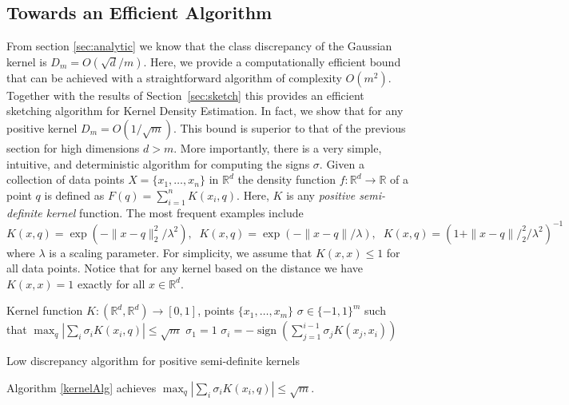 \documentclass[12pt]{colt2019} %
\newcommand{\R}{\mathbb{R}}
\begin{document}
\subsection{Towards an Efficient Algorithm}\label{kde2}

From section \ref{sec:analytic} we know that the class discrepancy of the Gaussian kernel is $D_m = O(\sqrt{d}/m)$. 
Here, we provide a computationally efficient bound that can be achieved with a straightforward algorithm of complexity $O(m^2)$. Together with the results of Section~\ref{sec:sketch} this provides an efficient sketching algorithm for Kernel Density Estimation. 
In fact, we show that for any positive kernel $D_m = O(1/\sqrt{m})$. This bound is superior to that of the previous section for high dimensions $d > m$. 
More importantly, there is a very simple, intuitive, and deterministic algorithm for computing the signs $\sigma$. 
Given a collection of data points $X = \{x_1,\ldots, x_n\}$ in $\R^d$ the density function $f: \R^d \rightarrow \R$ of a point $q$ is defined as $ F(q) = \sum_{i=1}^{n} K(x_i,q) $.
Here, $K$ is any \emph{positive semi-definite kernel} function. The most frequent examples include
$$ K(x,q) = \exp(- \|x-q\|_2^2/\lambda^2),\;\; K(x,q) = \exp(- \|x-q\|/\lambda) ,\;\;  K(x,q) = (1+\|x-q\|/_2^2/\lambda^2)^{-1}$$
where $\lambda$ is a scaling parameter. For simplicity, we assume that $K(x,x) \leq 1$ for all data points. Notice that for any kernel based on the distance we have $K(x,x)=1$ exactly for all $x \in \R^d$.

\begin{algorithm}
\begin{algorithmic}
 Kernel function $K:(\R^d,\R^d)\rightarrow[0,1]$, points  $\{x_1,\ldots,x_m\}$
 $\sigma \in \{-1,1\}^m$ such that $\max_q |\sum_i \sigma_i K(x_i,q) | \le \sqrt{m}$
\STATE$\sigma_1 = 1$
        \STATE $\sigma_i = -\operatorname{sign} (\sum_{j=1}^{i-1}\sigma_j  K(x_j, x_i))$
\ENDFOR 
\end{algorithmic}
\caption{Low discrepancy algorithm for positive semi-definite kernels}\label{kernelAlg}
\end{algorithm}


\begin{theorem} \label{thm:disc simple kernel}
Algorithm \ref{kernelAlg} achieves $\max_q |\sum_i \sigma_i K(x_i,q) | \le \sqrt{m}$.
\end{theorem}
\end{document}
